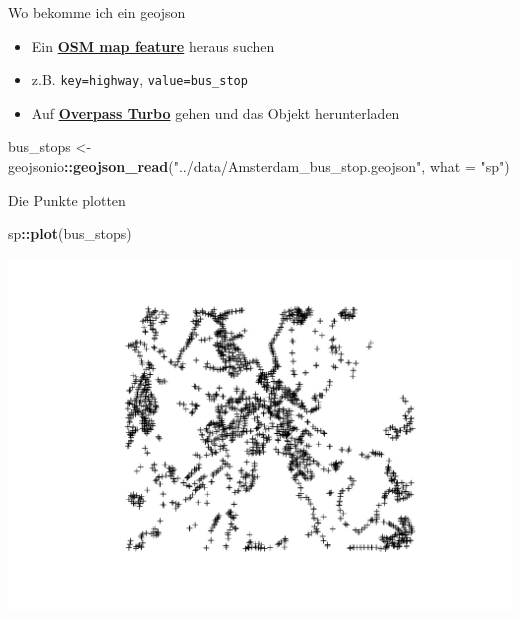 \documentclass[ignorenonframetext,]{beamer}
\newenvironment{Shaded}{\begin{snugshade}}{\end{snugshade}}
\newcommand{\KeywordTok}[1]{\textcolor[rgb]{0.13,0.29,0.53}{\textbf{#1}}}
\newcommand{\DataTypeTok}[1]{\textcolor[rgb]{0.13,0.29,0.53}{#1}}
\newcommand{\StringTok}[1]{\textcolor[rgb]{0.31,0.60,0.02}{#1}}
\newcommand{\OperatorTok}[1]{\textcolor[rgb]{0.81,0.36,0.00}{\textbf{#1}}}
\newcommand{\NormalTok}[1]{#1}
\providecommand{\tightlist}{%
  \setlength{\itemsep}{0pt}\setlength{\parskip}{0pt}}
\begin{document}
\begin{frame}[fragile]{Wo bekomme ich ein geojson}

\begin{itemize}
\tightlist
\item
  Ein
  \href{https://wiki.openstreetmap.org/wiki/Map_Features}{\textbf{OSM
  map feature}} heraus suchen
\item
  z.B. \texttt{key=highway}, \texttt{value=bus\_stop}
\item
  Auf \href{https://overpass-turbo.eu/}{\textbf{Overpass Turbo}} gehen
  und das Objekt herunterladen
\end{itemize}

\begin{Shaded}
\begin{Highlighting}[]
\NormalTok{bus_stops <-}\StringTok{ }\NormalTok{geojsonio}\OperatorTok{::}\KeywordTok{geojson_read}\NormalTok{(}\StringTok{"../data/Amsterdam_bus_stop.geojson"}\NormalTok{,}
  \DataTypeTok{what =} \StringTok{"sp"}\NormalTok{)}
\end{Highlighting}
\end{Shaded}

\end{frame}

\begin{frame}[fragile]{Die Punkte plotten}

\begin{Shaded}
\begin{Highlighting}[]
\NormalTok{sp}\OperatorTok{::}\KeywordTok{plot}\NormalTok{(bus_stops)}
\end{Highlighting}
\end{Shaded}

\includegraphics{using_javascript_files/figure-beamer/unnamed-chunk-30-1.pdf}

\end{frame}
\end{document}

